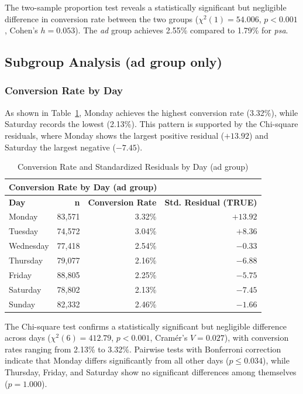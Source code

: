 \documentclass[12pt]{article}
\begin{document}
The two-sample proportion test reveals a statistically significant but negligible 
difference in conversion rate between the two groups ($\chi^2(1) = 54.006$, 
$p < 0.001$, Cohen's $h = 0.053$). The \textit{ad} group achieves 2.55\% compared 
to 1.79\% for \textit{psa}.

\subsection{Subgroup Analysis (ad group only)}

\subsubsection{Conversion Rate by Day}
As shown in Table~\ref{tab:day_summary}, Monday achieves the highest conversion 
rate (3.32\%), while Saturday records the lowest (2.13\%). This pattern is 
supported by the Chi-square residuals, where Monday shows the largest positive 
residual ($+13.92$) and Saturday the largest negative ($-7.45$).

\begin{table}[H]
\centering
\begin{tabular}{lrrr}
\toprule
\multicolumn{4}{l}{\textbf{Conversion Rate by Day (ad group)}} \\
\midrule
\textbf{Day} & \textbf{n} & \textbf{Conversion Rate} & \textbf{Std. Residual (TRUE)} \\
\midrule
Monday    & 83,571 & 3.32\% & $+13.92$ \\
Tuesday   & 74,572 & 3.04\% & $+8.36$  \\
Wednesday & 77,418 & 2.54\% & $-0.33$  \\
Thursday  & 79,077 & 2.16\% & $-6.88$  \\
Friday    & 88,805 & 2.25\% & $-5.75$  \\
Saturday  & 78,802 & 2.13\% & $-7.45$  \\
Sunday    & 82,332 & 2.46\% & $-1.66$  \\
\bottomrule
\end{tabular}
\caption{Conversion Rate and Standardized Residuals by Day (ad group)}
\label{tab:day_summary}
\end{table}

The Chi-square test confirms a statistically significant but negligible difference 
across days ($\chi^2(6) = 412.79$, $p < 0.001$, Cramér's $V = 0.027$), with 
conversion rates ranging from 2.13\% to 3.32\%. Pairwise tests with Bonferroni 
correction indicate that Monday differs significantly from all other days 
($p \leq 0.034$), while Thursday, Friday, and Saturday show no significant 
differences among themselves ($p = 1.000$).
\end{document}
